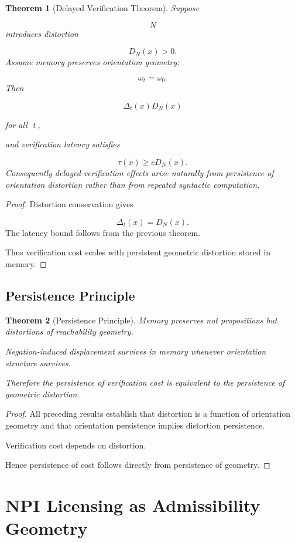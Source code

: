 \documentclass[12pt]{article}
\newtheorem{theorem}{Theorem}[section]
\theoremstyle{remark}
\begin{document}
\begin{theorem}[Delayed Verification Theorem]
Suppose

\[
N
\]
introduces distortion

\[
D_N(x)>0.
\]
Assume memory preserves orientation geometry:

\[
\omega_t=\omega_0.
\]
Then

\[
\Delta_t(x)
D_N(x)
\]

for all t,

and verification latency satisfies

\[
\tau(x)
\ge
cD_N(x).
\]
Consequently delayed-verification effects arise naturally from persistence of orientation distortion rather than from repeated syntactic computation.
\end{theorem}

\begin{proof}
Distortion conservation gives

\[
\Delta_t(x)=D_N(x).
\]
The latency bound follows from the previous theorem.

Thus verification cost scales with persistent geometric distortion stored in memory.
\end{proof}

\subsection{Persistence Principle}

\begin{theorem}[Persistence Principle]
Memory preserves not propositions but distortions of reachability geometry.

Negation-induced displacement survives in memory whenever orientation structure survives.

Therefore the persistence of verification cost is equivalent to the persistence of geometric distortion.
\end{theorem}

\begin{proof}
All preceding results establish that distortion is a function of orientation geometry and that orientation persistence implies distortion persistence.

Verification cost depends on distortion.

Hence persistence of cost follows directly from persistence of geometry.
\end{proof}

\section{NPI Licensing as Admissibility Geometry}
\end{document}
